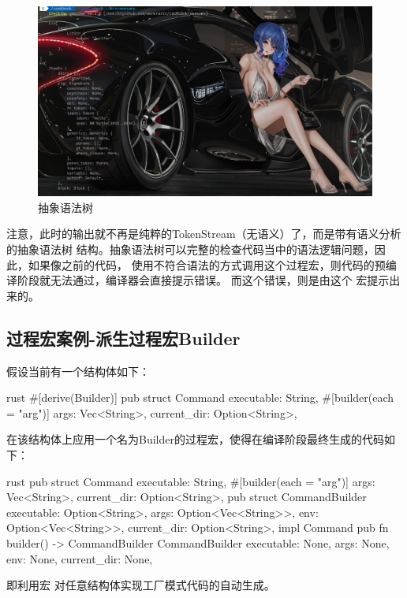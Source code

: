 \begin{figure}[H]
  \centering
  \includegraphics[width=\linewidth]{rust_ast.png}
  \caption{抽象语法树}
  \label{fig:rust_ast}
\end{figure}
注意，此时的输出就不再是纯粹的TokenStream（无语义）了，而是带有语义分析的抽象语法树
结构。抽象语法树可以完整的检查代码当中的语法逻辑问题，因此，如果像之前的代码，
使用不符合语法的方式调用这个过程宏，则代码的预编译阶段就无法通过，编译器会直接提示错误。
而这个错误，则是由这个
宏提示出来的。

\subsection{过程宏案例-派生过程宏Builder}
\label{builder}
假设当前有一个结构体如下：
\begin{code-block}{rust}
#[derive(Builder)]
pub struct Command {
    executable: String,
    #[builder(each = "arg")]
    args: Vec<String>,
    current_dir: Option<String>,
}
\end{code-block}
在该结构体上应用一个名为Builder的过程宏，使得在编译阶段最终生成的代码如下：
\begin{code-block}{rust}
pub struct Command {
    executable: String,
    #[builder(each = "arg")]
    args: Vec<String>,
    current_dir: Option<String>,
}
pub struct CommandBuilder {
    executable: Option<String>,
    args: Option<Vec<String>>,
    env: Option<Vec<String>>,
    current_dir: Option<String>,
}
impl Command {
    pub fn builder() -> CommandBuilder {
        CommandBuilder {
            executable: None,
            args: None,
            env: None,
            current_dir: None,
        }
    }
}
\end{code-block}
即利用宏
对任意结构体实现工厂模式代码的自动生成。

